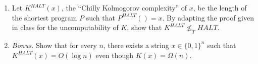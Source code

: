 \documentclass[11pt]{article}
\begin{document}
\begin{enumerate}
\begin{enumerate}
\item Let $K^{HALT}(x)$, the ``Chilly Kolmogorov complexity'' of $x$, be the length of the shortest program $P$ such that $P^{HALT} () = x$. By adapting the proof given in class for the uncomputability of $K$, show that $K^{HALT} \not \leq_T HALT$.

\item \emph{Bonus.} Show that for every $n$, there exists a string $x \in \{0, 1\}^n$ such that $K^{HALT} (x) = O (\log n)$ even though $K (x) = \Omega(n)$.
\end{enumerate}

\end{enumerate}
\end{document}
